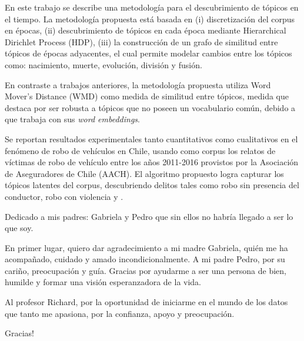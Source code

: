\documentclass[letterpaper,12pt,oneside]{book} %
\begin{document}



\begin{resumen}
    En este trabajo se describe una metodología para el descubrimiento de tópicos en el tiempo. La metodología propuesta está basada en (i) discretización del corpus en épocas, (ii) descubrimiento de tópicos en cada época mediante Hierarchical Dirichlet Process (HDP), (iii) la construcción de un grafo de similitud entre tópicos de épocas adyacentes, el cual permite modelar cambios entre los tópicos como: nacimiento, muerte, evolución, división y fusión. \newline

    En contraste a trabajos anteriores, la metodología propuesta utiliza Word Mover's Distance (WMD) como medida de similitud entre tópicos, medida que destaca por ser robusta a tópicos que no poseen un vocabulario común, debido a que trabaja con sus \textit{word embeddings}. \newline

    Se reportan resultados experimentales tanto cuantitativos como cualitativos en el fenómeno de robo de vehículos en Chile, usando como corpus los relatos de víctimas de robo de vehículo entre los años 2011-2016 provistos por la Asociación de Aseguradores de Chile (AACH). El algoritmo propuesto logra capturar los tópicos latentes del corpus, descubriendo delitos tales como robo sin presencia del conductor, robo con violencia y .
\end{resumen}

\begin{dedicatoria}
Dedicado a mis padres: Gabriela y Pedro que sin ellos no habría llegado a ser lo que soy.

\end{dedicatoria}

\begin{agradecimientos}
En primer lugar, quiero dar agradecimiento a mi madre Gabriela, quién me ha acompañado, cuidado y amado incondicionalmente. A mi padre Pedro, por su cariño, preocupación y guía. Gracias por ayudarme a ser una persona de bien, humilde y formar una visión esperanzadora de la vida.\newline

Al profesor Richard, por la oportunidad de iniciarme en el mundo de los datos que tanto me apasiona, por la confianza, apoyo y preocupación.\newline


Gracias!

\end{agradecimientos}
\end{document}
